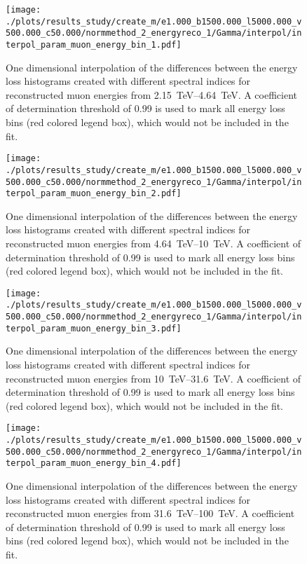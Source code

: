 \begin{figure}[H]
    \centering
    \texttt{[image: ./plots/results\_study/create\_m/e1.000\_b1500.000\_l5000.000\_v500.000\_c50.000/normmethod\_2\_energyreco\_1/Gamma/interpol/interpol\_param\_muon\_energy\_bin\_1.pdf]}
    \caption{One dimensional interpolation of the differences between the energy loss histograms created with different spectral indices for reconstructed muon energies from \SIrange{2.15}{4.64}{TeV}. A coefficient of determination threshold of \num{0.99} is used to mark all energy loss bins (red colored legend box), which would not be included in the fit.}
    \label{fig:study_1d_interpol_mu1_nn_base_gamma}
\end{figure}

\begin{figure}[H]
    \centering
    \texttt{[image: ./plots/results\_study/create\_m/e1.000\_b1500.000\_l5000.000\_v500.000\_c50.000/normmethod\_2\_energyreco\_1/Gamma/interpol/interpol\_param\_muon\_energy\_bin\_2.pdf]}
    \caption{One dimensional interpolation of the differences between the energy loss histograms created with different spectral indices for reconstructed muon energies from \SIrange{4.64}{10}{TeV}. A coefficient of determination threshold of \num{0.99} is used to mark all energy loss bins (red colored legend box), which would not be included in the fit.}
    \label{fig:study_1d_interpol_mu2_nn_base_gamma}
\end{figure}

\begin{figure}[H]
    \centering
    \texttt{[image: ./plots/results\_study/create\_m/e1.000\_b1500.000\_l5000.000\_v500.000\_c50.000/normmethod\_2\_energyreco\_1/Gamma/interpol/interpol\_param\_muon\_energy\_bin\_3.pdf]}
    \caption{One dimensional interpolation of the differences between the energy loss histograms created with different spectral indices for reconstructed muon energies from \SIrange{10}{31.6}{TeV}. A coefficient of determination threshold of \num{0.99} is used to mark all energy loss bins (red colored legend box), which would not be included in the fit.}
    \label{fig:study_1d_interpol_mu3_nn_base_gamma}
\end{figure}

\begin{figure}[H]
    \centering
    \texttt{[image: ./plots/results\_study/create\_m/e1.000\_b1500.000\_l5000.000\_v500.000\_c50.000/normmethod\_2\_energyreco\_1/Gamma/interpol/interpol\_param\_muon\_energy\_bin\_4.pdf]}
    \caption{One dimensional interpolation of the differences between the energy loss histograms created with different spectral indices for reconstructed muon energies from \SIrange{31.6}{100}{TeV}. A coefficient of determination threshold of \num{0.99} is used to mark all energy loss bins (red colored legend box), which would not be included in the fit.}
    \label{fig:study_1d_interpol_mu4_nn_base_gamma}
\end{figure}

